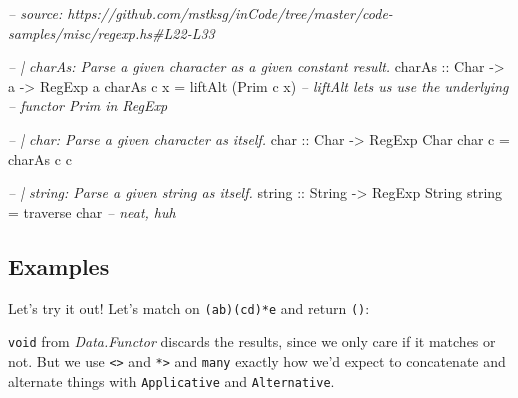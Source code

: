 \documentclass[]{article}
\newenvironment{Shaded}{}{}
\newcommand{\CharTok}[1]{\textcolor[rgb]{0.25,0.44,0.63}{#1}}
\newcommand{\CommentTok}[1]{\textcolor[rgb]{0.38,0.63,0.69}{\textit{#1}}}
\newcommand{\DataTypeTok}[1]{\textcolor[rgb]{0.56,0.13,0.00}{#1}}
\newcommand{\FunctionTok}[1]{\textcolor[rgb]{0.02,0.16,0.49}{#1}}
\newcommand{\NormalTok}[1]{#1}
\newcommand{\OtherTok}[1]{\textcolor[rgb]{0.00,0.44,0.13}{#1}}
\newcommand{\StringTok}[1]{\textcolor[rgb]{0.25,0.44,0.63}{#1}}
\begin{document}
\begin{Shaded}
\begin{Highlighting}[]
\CommentTok{-- source: https://github.com/mstksg/inCode/tree/master/code-samples/misc/regexp.hs#L22-L33}

\CommentTok{-- | charAs: Parse a given character as a given constant result.}
\OtherTok{charAs ::} \DataTypeTok{Char} \OtherTok{->}\NormalTok{ a }\OtherTok{->} \DataTypeTok{RegExp}\NormalTok{ a}
\NormalTok{charAs c x }\FunctionTok{=}\NormalTok{ liftAlt (}\DataTypeTok{Prim}\NormalTok{ c x)     }\CommentTok{-- liftAlt lets us use the underlying}
                                    \CommentTok{-- functor Prim in RegExp}

\CommentTok{-- | char: Parse a given character as itself.}
\OtherTok{char ::} \DataTypeTok{Char} \OtherTok{->} \DataTypeTok{RegExp} \DataTypeTok{Char}
\NormalTok{char c }\FunctionTok{=}\NormalTok{ charAs c c}

\CommentTok{-- | string: Parse a given string as itself.}
\OtherTok{string ::} \DataTypeTok{String} \OtherTok{->} \DataTypeTok{RegExp} \DataTypeTok{String}
\NormalTok{string }\FunctionTok{=} \FunctionTok{traverse}\NormalTok{ char              }\CommentTok{-- neat, huh}
\end{Highlighting}
\end{Shaded}

\hypertarget{examples}{%
\subsection{Examples}\label{examples}}

Let's try it out! Let's match on \texttt{(a\textbar{}b)(cd)*e} and return
\texttt{()}:

\begin{Shaded}
\end{Shaded}

\texttt{void} from \emph{Data.Functor} discards the results, since we only care
if it matches or not. But we use \texttt{\textless{}\textbar{}\textgreater{}}
and \texttt{*\textgreater{}} and \texttt{many} exactly how we'd expect to
concatenate and alternate things with \texttt{Applicative} and
\texttt{Alternative}.
\end{document}
